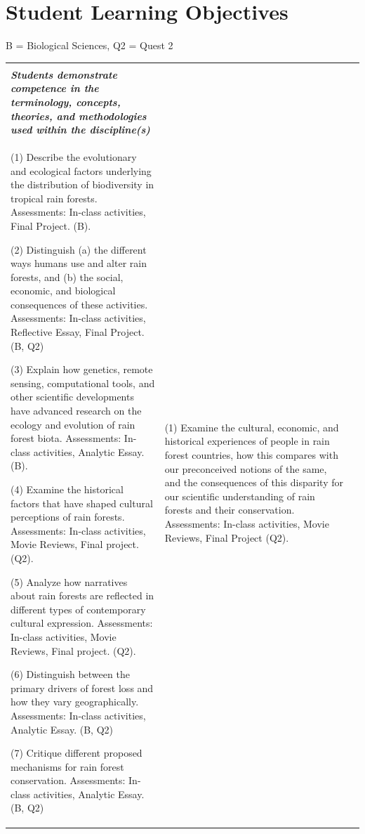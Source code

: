 \documentclass[
  10pt,
  letterpaper,
  oneside,
  open=any]{scrbook}
\begin{document}

\chapter{Student Learning Objectives}\label{student-learning-objectives}

B = Biological Sciences, Q2 = Quest 2

\begin{tabular}[t]{>{\raggedright\arraybackslash}p{25em}>{\raggedright\arraybackslash}p{25em}l}
\toprule
\cellcolor[HTML]{1F691B}{\textcolor{white}{\textbf{CONTENT}}} & \cellcolor[HTML]{1F691B}{\textcolor{white}{\textbf{CONNECTION}}} & \cellcolor[HTML]{1F691B}{\textcolor{white}{\textbf{}}}\\
\em{\textbf{Students demonstrate competence in the terminology, concepts, theories, and methodologies used within the discipline(s)}} & \em{\textbf{\cellcolor{white}{\textcolor{black}{Students connect course content with meaningful critical reflection on their intellectual, personal, and professional development at UF and beyond.}}}} & \em{\textbf{}}\\
(1) Describe the evolutionary and ecological factors underlying the distribution of biodiversity in tropical rain forests. Assessments: In-class activities, Final Project. (B). 

(2)  Distinguish (a) the different ways humans use and alter rain forests, and (b) the social, economic, and biological consequences of these activities. Assessments: In-class activities, Reflective Essay, Final Project. (B, Q2)  

(3)  Explain how genetics, remote sensing, computational tools, and other scientific developments have advanced research on the ecology and evolution of rain forest biota. Assessments: In-class activities, Analytic Essay. (B). 

(4)  Examine the historical factors that have shaped cultural perceptions of rain forests. Assessments: In-class activities, Movie Reviews, Final project. (Q2).  

(5)  Analyze how narratives about rain forests are reflected in different types of contemporary cultural expression. Assessments: In-class activities, Movie Reviews, Final project. (Q2).  

(6)  Distinguish between the primary drivers of forest loss and how they vary geographically. Assessments: In-class activities, Analytic Essay. (B, Q2)  

(7)  Critique different proposed mechanisms for rain forest conservation. Assessments: In-class activities, Analytic Essay. (B, Q2) & (1) Examine the cultural, economic, and historical experiences of people in rain forest countries, how this compares with our preconceived notions of the same, and the consequences of this disparity for our scientific understanding of rain forests and their conservation. Assessments: In-class activities, Movie Reviews, Final Project  (Q2). 


\end{tabular}
\end{document}
